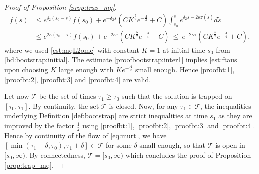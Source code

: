 \documentclass[11pt]{aims}
\theoremstyle{definition}
\numberwithin{equation}{section}
\begin{document}
\begin{proof}[Proof of Proposition \ref{prop:trap_mq}]
\begin{align}
\nonumber f(s) & \leq e^{\delta_2 (s_0-s)} f(s_0)+e^{-\delta_2 s}  \left(CK^\frac{5}{2}e^{-\frac A4} +C\right) \int_{s_0}^s e^{\delta_2 \tilde s-2\kappa \tau(\tilde s)}  d\tilde s \\
\label{proofbootstrap:inter1}& \leq e^{2 \kappa (\tau_0-\tau)}f(s_0)+e^{-2\kappa \tau}\left(CK^\frac{5}{2}e^{-\frac A4} +C\right) \ \leq \ e^{-2\kappa \tau}\left(CK^\frac{5}{2}e^{-\frac A4} +C\right),
\end{align}
where we used \eqref{est:mqL2ome} with constant $K=1$ at initial time $s_0$ from \eqref{bd:bootstrap:initial}. The estimate \eqref{proofbootstrap:inter1} implies \eqref{est:ftaus} upon choosing $K$ large enough with $K e^{-\frac  A2}$ small enough. Hence \eqref{proofbt:1}, \eqref{proofbt:2}, \eqref{proofbt:3} and \eqref{proofbt:4} are valid.

Let now $\mathcal T$ be the set of times $\tau_1\geq \tau_0$ such that the solution is trapped on $[\tau_0,\tau_1]$. By continuity, the set $\mathcal T$ is closed. Now, for any $\tau_1\in \mathcal T$, the inequalities underlying Definition \ref{def:bootstrap} are strict inequalities at time $s_1$ as they are improved by the factor $\frac{1}{2}$ using \eqref{proofbt:1}, \eqref{proofbt:2}, \eqref{proofbt:3} and \eqref{proofbt:4}. Hence by continuity of the flow of \eqref{eq:murt}, we have $[\min (\tau_1-\delta,\tau_0),\tau_1+\delta]\subset \mathcal T$ for some $\delta$ small enough, so that $\mathcal T$ is open in $[s_0,\infty)$. By connectedness, $\mathcal T=[s_0,\infty)$ which concludes the proof of Proposition \ref{prop:trap_mq}.  \end{proof}
\end{document}
